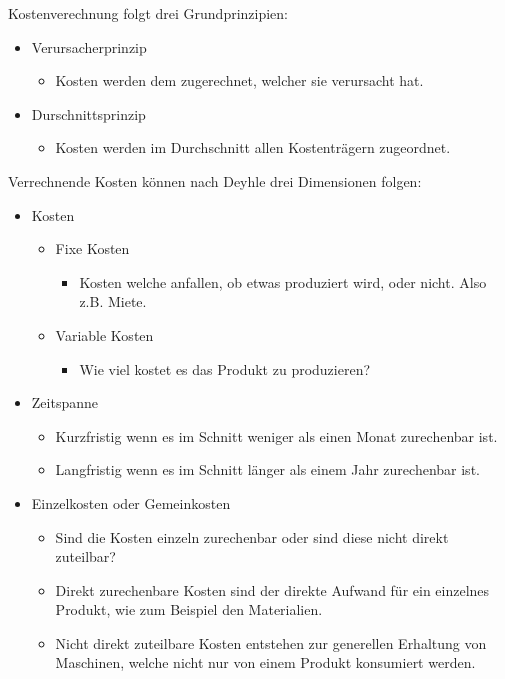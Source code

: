 \documentclass{article}
\begin{document}
	Kostenverechnung folgt drei Grundprinzipien:
	\begin{itemize}
		\item{Verursacherprinzip}
		\begin{itemize}
			\item{Kosten werden dem zugerechnet, welcher sie verursacht hat.}
		\end{itemize}
		\item{Durschnittsprinzip}
		\begin{itemize}
			\item{Kosten werden im Durchschnitt allen Kostenträgern zugeordnet.}
		\end{itemize}
	\end{itemize}

	Verrechnende Kosten können nach Deyhle drei Dimensionen folgen:
	\begin{itemize}
		\item{Kosten}
		\begin{itemize}
			\item{Fixe Kosten}
			\begin{itemize}
				\item{Kosten welche anfallen, ob etwas produziert wird, oder nicht. Also z.B. Miete.}
			\end{itemize}
			\item{Variable Kosten}
			\begin{itemize}
				\item{Wie viel kostet es das Produkt zu produzieren?}
			\end{itemize}
		\end{itemize}
		\item{Zeitspanne}
		\begin{itemize}
			\item{Kurzfristig wenn es im Schnitt weniger als einen Monat zurechenbar ist.}
			\item{Langfristig wenn es im Schnitt länger als einem Jahr zurechenbar ist.}
		\end{itemize}
		\item{Einzelkosten oder Gemeinkosten}
		\begin{itemize}
			\item{Sind die Kosten einzeln zurechenbar oder sind diese nicht direkt zuteilbar?}
			\item{Direkt zurechenbare Kosten sind der direkte Aufwand für ein einzelnes Produkt, wie zum Beispiel den Materialien.}
			\item{Nicht direkt zuteilbare Kosten entstehen zur generellen Erhaltung von Maschinen, welche nicht nur von einem Produkt konsumiert werden.}
		\end{itemize}
	\end{itemize}
\end{document}
